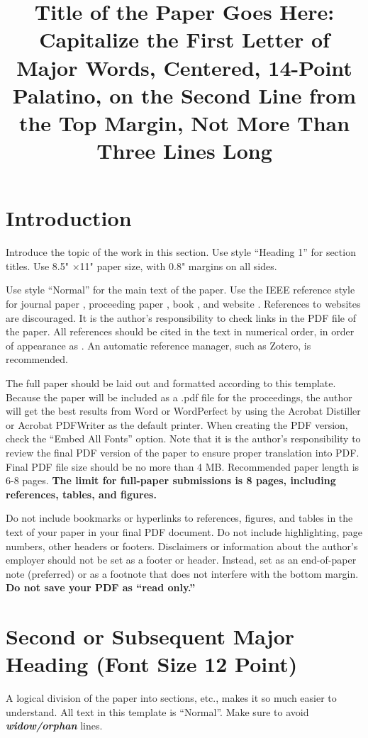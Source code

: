 \documentclass[letterpaper]{physor2026}
\title{Title of the Paper Goes Here: Capitalize the First Letter of Major Words, Centered, 14-Point Palatino, on the Second Line from the Top Margin, Not More Than Three Lines Long}
\begin{document}
\section{Introduction}\label{sec:1}
Introduce the topic of the work in this section.
Use style ``Heading 1'' for section titles. Use 8.5" ×11" paper size, with 0.8" margins on all sides.

Use style ``Normal'' for the main text of the paper.
Use the IEEE reference style for journal paper \cite{journal}, proceeding paper \cite{conf_paper}, book \cite{book}, and website \cite{website}.
References to websites are discouraged. It is the author’s responsibility to check links in the PDF file of the paper.
All references should be cited in the text in numerical order, in order of appearance as \cite{book,website,proc_paper}. An automatic reference manager, such as Zotero, is recommended.

The full paper should be laid out and formatted according to this template.
Because the paper will be included as a .pdf file for the proceedings, the author will get the best results from Word or WordPerfect by using the Acrobat Distiller or Acrobat PDFWriter as the default printer.
When creating the PDF version, check the ``Embed All Fonts'' option.
Note that it is the author's responsibility to review the final PDF version of the paper to ensure proper translation into PDF.
Final PDF file size should be no more than 4 MB.
Recommended paper length is 6-8 pages.
\textbf{The limit for full-paper submissions is 8 pages, including references, tables, and figures.}

Do not include bookmarks or hyperlinks to references, figures, and tables in the text of your paper in your final PDF document.
Do not include highlighting, page numbers, other headers or footers.
Disclaimers or information about the author’s employer should not be set as a footer or header.
Instead, set as an end-of-paper note (preferred) or as a footnote that does not interfere with the bottom margin. \textbf{Do not save your PDF as ``read only.''}

 
\section{Second or Subsequent Major Heading (Font Size 12 Point)} \label{sec:2}

A logical division of the paper into sections, etc., makes it so much easier to understand. All text in this template is ``Normal''.
Make sure to avoid \textbf{\textit{widow/orphan}}  lines.
\end{document}
